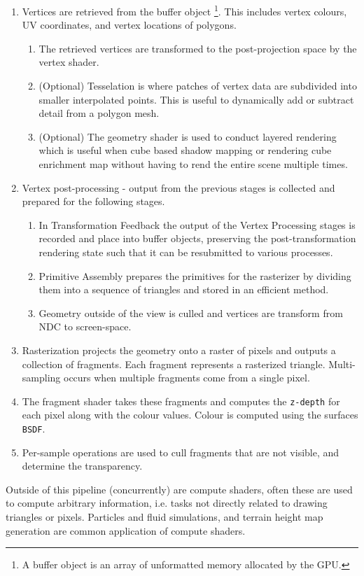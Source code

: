 \documentclass[11pt]{article}
\begin{document}
\begin{enumerate}
\item Vertices are retrieved from the buffer object \footnote{A buffer object is an array of unformatted memory allocated by the GPU.}. This includes vertex
colours, UV coordinates, and vertex locations of polygons.
\begin{enumerate}
\item The retrieved vertices are transformed to the post-projection space by the
vertex shader.
\item (Optional) Tesselation is where patches of vertex data are subdivided into
smaller interpolated points. This is useful to dynamically add or subtract
detail from a polygon mesh.
\item (Optional) The geometry shader is used to conduct layered rendering which is
useful when cube based shadow mapping or rendering cube enrichment map
without having to rend the entire scene multiple times.
\end{enumerate}
\item Vertex post-processing - output from the previous stages is collected
and prepared for the following stages.
\begin{enumerate}
\item In Transformation Feedback the output of the Vertex Processing stages is
recorded and place into buffer objects, preserving the post-transformation
rendering state such that it can be resubmitted to various processes.
\item Primitive Assembly prepares the primitives for the rasterizer by dividing
them into a sequence of triangles and stored in an efficient method.
\item Geometry outside of the view is culled and vertices are transform from NDC
to screen-space.
\end{enumerate}
\item Rasterization projects the geometry onto a raster of pixels and outputs a
collection of fragments. Each fragment represents a rasterized triangle.
Multi-sampling occurs when multiple fragments come from a single pixel.
\item The fragment shader takes these fragments and computes the \texttt{z-depth} for
each pixel along with the colour values. Colour is computed using the
surfaces \texttt{BSDF}.
\item Per-sample operations are used to cull fragments that are not visible, and
determine the transparency.
\end{enumerate}
Outside of this pipeline (concurrently) are compute shaders, often these are
used to compute arbitrary information, i.e. tasks not directly related to drawing
triangles or pixels. Particles and fluid simulations, and terrain height map
generation are common application of compute shaders.
\end{document}
